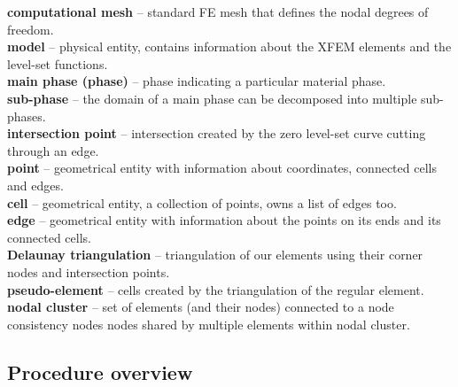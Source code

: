 \noindent
\textbf{computational mesh} -- standard FE mesh that defines the nodal degrees of freedom. \\
\textbf{model} -- physical entity, contains information about the XFEM elements and the level-set functions. \\
\textbf{main phase (phase)} -- phase indicating a particular material phase. \\
\textbf{sub-phase} -- the domain of a main phase can be decomposed into multiple sub-phases. \\
\textbf{intersection point} -- intersection created by the zero level-set curve cutting through an edge. \\
\textbf{point} -- geometrical entity with information about coordinates, connected cells and edges. \\
\textbf{cell} -- geometrical entity, a collection of points, owns a list of edges too. \\
\textbf{edge} -- geometrical entity with information about the points on its ends and its connected cells. \\
\textbf{Delaunay triangulation} -- triangulation of our elements using their corner nodes and intersection points. \\
\textbf{pseudo-element} -- cells created by the triangulation of the regular element. \\
\textbf{nodal cluster} -- set of elements (and their nodes) connected to a node
consistency nodes	nodes shared by multiple elements within nodal cluster. \\


\subsection{Procedure overview}

